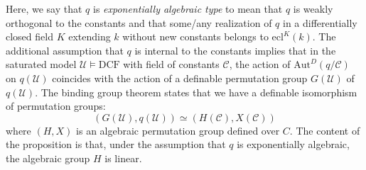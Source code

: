 \documentclass[12pt]{amsart}
\newcommand{\DCF}{\mathrm{DCF}}
\theoremstyle{definition}
\theoremstyle{plain}
\theoremstyle{exampstyle}\newtheorem{thmx}{Theorem}
\theoremstyle{exampstyle}\newtheorem{thmxbis}{Theorem}
\begin{document}
Here, we say that $q$ is {\em exponentially algebraic type} to mean that $q$ is weakly orthogonal to the constants and that some/any realization of $q$ in a differentially closed field $K$ extending $k$ without new constants belongs to $\mathrm{ecl}^K(k)$. The additional assumption that $q$ is internal to the constants implies that in the saturated model $\mathcal U \models \DCF$ with field of constants $\mathcal C$, the action of $\mathrm{Aut}^D(q/\mathcal C)$ on $q(\mathcal U)$ coincides with the action of a definable permutation group $G(\mathcal U)$ of $q(\mathcal U)$. The binding group theorem \cite[Appendix B]{Hrushovski-Galois}  states that we have a definable isomorphism of permutation groups:
$$ (G(\mathcal U), q(\mathcal U)) \simeq (H(\mathcal C), X(\mathcal C)) $$
where $(H,X)$ is an algebraic permutation group defined over $C$. The content of the proposition is that, under the assumption that $q$ is exponentially algebraic, the algebraic group $H$ is linear.
\end{document}
